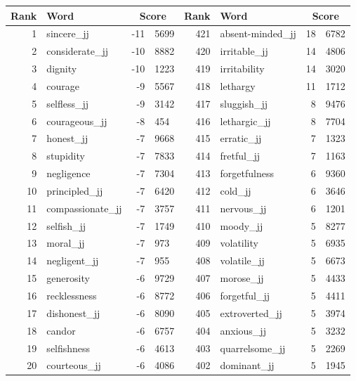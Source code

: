 \begin{table}[tbp]
    \begin{tabular}{| rlr@{.}l | rlr@{.}l |}
    \hline
    \textbf{Rank} & \textbf{Word} & \multicolumn{2}{c|}{\textbf{Score}} & \textbf{Rank} & \textbf{Word} & \multicolumn{2}{c|}{\textbf{Score}} \\
    \hline
    1 & sincere\_jj & -11 & 5699    &    421 & absent-minded\_jj & 18 & 6782 \\
    2 & considerate\_jj & -10 & 8882    &    420 & irritable\_jj & 14 & 4806 \\
    3 & dignity & -10 & 1223    &    419 & irritability & 14 & 3020 \\
    4 & courage & -9 & 5567    &    418 & lethargy & 11 & 1712 \\
    5 & selfless\_jj & -9 & 3142    &    417 & sluggish\_jj & 8 & 9476 \\
    6 & courageous\_jj & -8 & 454    &    416 & lethargic\_jj & 8 & 7704 \\
    7 & honest\_jj & -7 & 9668    &    415 & erratic\_jj & 7 & 1323 \\
    8 & stupidity & -7 & 7833    &    414 & fretful\_jj & 7 & 1163 \\
    9 & negligence & -7 & 7304    &    413 & forgetfulness & 6 & 9360 \\
    10 & principled\_jj & -7 & 6420    &    412 & cold\_jj & 6 & 3646 \\
    11 & compassionate\_jj & -7 & 3757    &    411 & nervous\_jj & 6 & 1201 \\
    12 & selfish\_jj & -7 & 1749    &    410 & moody\_jj & 5 & 8277 \\
    13 & moral\_jj & -7 & 973    &    409 & volatility & 5 & 6935 \\
    14 & negligent\_jj & -7 & 955    &    408 & volatile\_jj & 5 & 6673 \\
    15 & generosity & -6 & 9729    &    407 & morose\_jj & 5 & 4433 \\
    16 & recklessness & -6 & 8772    &    406 & forgetful\_jj & 5 & 4411 \\
    17 & dishonest\_jj & -6 & 8090    &    405 & extroverted\_jj & 5 & 3974 \\
    18 & candor & -6 & 6757    &    404 & anxious\_jj & 5 & 3232 \\
    19 & selfishness & -6 & 4613    &    403 & quarrelsome\_jj & 5 & 2269 \\
    20 & courteous\_jj & -6 & 4086    &    402 & dominant\_jj & 5 & 1945 \\

\end{tabular}
\end{table}
